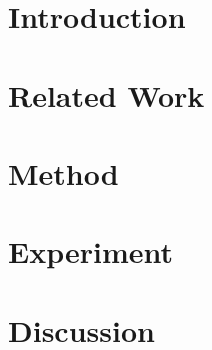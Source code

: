 \documentclass{article} %
\begin{document}
\section{Introduction}


\section{Related Work}


\section{Method}


\section{Experiment}


\section{Discussion}





\clearpage
\appendix

\end{document}
